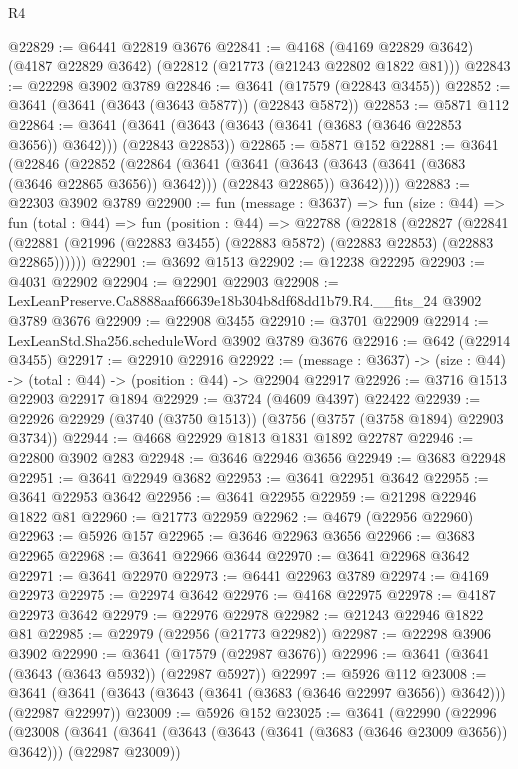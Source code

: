 \begin{lexlean}{R4}
\begin{coremodule}
@22829 := @6441 @22819 @3676
@22841 := @4168
    (@4169 @22829 @3642)
    (@4187 @22829 @3642)
    (@22812 (@21773 (@21243 @22802 @1822 @81)))
@22843 := @22298 @3902 @3789
@22846 := @3641 (@17579 (@22843 @3455))
@22852 := @3641 (@3641 (@3643 (@3643 @5877)) (@22843 @5872))
@22853 := @5871 @112
@22864 := @3641 (@3641 (@3643 (@3643 (@3641 (@3683 (@3646 @22853 @3656)) @3642))) (@22843 @22853))
@22865 := @5871 @152
@22881 := @3641
    (@22846
      (@22852
        (@22864
          (@3641
            (@3641 (@3643 (@3643 (@3641 (@3683 (@3646 @22865 @3656)) @3642))) (@22843 @22865))
            @3642))))
@22883 := @22303 @3902 @3789
@22900 := fun (message : @3637) =>
  fun (size : @44) =>
  fun (total : @44) =>
  fun (position : @44) =>
  @22788
    (@22818
      (@22827
        (@22841 (@22881 (@21996 (@22883 @3455) (@22883 @5872) (@22883 @22853) (@22883 @22865))))))
@22901 := @3692 @1513
@22902 := @12238 @22295
@22903 := @4031 @22902
@22904 := @22901 @22903
@22908 := LexLeanPreserve.Ca8888aaf66639e18b304b8df68dd1b79.R4.__fits_24 @3902 @3789 @3676
@22909 := @22908 @3455
@22910 := @3701 @22909
@22914 := LexLeanStd.Sha256.scheduleWord @3902 @3789 @3676
@22916 := @642 (@22914 @3455)
@22917 := @22910 @22916
@22922 := (message : @3637) -> (size : @44) -> (total : @44) -> (position : @44) -> @22904 @22917
@22926 := @3716 @1513 @22903 @22917 @1894
@22929 := @3724 (@4609 @4397) @22422
@22939 := @22926 @22929 (@3740 (@3750 @1513)) (@3756 (@3757 (@3758 @1894) @22903 @3734))
@22944 := @4668 @22929 @1813 @1831 @1892 @22787
@22946 := @22800 @3902 @283
@22948 := @3646 @22946 @3656
@22949 := @3683 @22948
@22951 := @3641 @22949 @3682
@22953 := @3641 @22951 @3642
@22955 := @3641 @22953 @3642
@22956 := @3641 @22955
@22959 := @21298 @22946 @1822 @81
@22960 := @21773 @22959
@22962 := @4679 (@22956 @22960)
@22963 := @5926 @157
@22965 := @3646 @22963 @3656
@22966 := @3683 @22965
@22968 := @3641 @22966 @3644
@22970 := @3641 @22968 @3642
@22971 := @3641 @22970
@22973 := @6441 @22963 @3789
@22974 := @4169 @22973
@22975 := @22974 @3642
@22976 := @4168 @22975
@22978 := @4187 @22973 @3642
@22979 := @22976 @22978
@22982 := @21243 @22946 @1822 @81
@22985 := @22979 (@22956 (@21773 @22982))
@22987 := @22298 @3906 @3902
@22990 := @3641 (@17579 (@22987 @3676))
@22996 := @3641 (@3641 (@3643 (@3643 @5932)) (@22987 @5927))
@22997 := @5926 @112
@23008 := @3641 (@3641 (@3643 (@3643 (@3641 (@3683 (@3646 @22997 @3656)) @3642))) (@22987 @22997))
@23009 := @5926 @152
@23025 := @3641
    (@22990
      (@22996
        (@23008
          (@3641
            (@3641 (@3643 (@3643 (@3641 (@3683 (@3646 @23009 @3656)) @3642))) (@22987 @23009))

\end{coremodule}
\end{lexlean}
